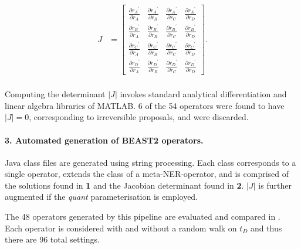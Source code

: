 \documentclass[10pt,letterpaper]{article}
\begin{document}
\begin{align}
	J &= \begin{bmatrix} \frac{\partial {r_A}^\prime}{\partial r_A} & \frac{\partial {r_A}^\prime}{\partial r_B} & \frac{\partial {r_A}^\prime}{\partial r_C} & \frac{\partial {r_A}^\prime}{\partial r_D} \\
	\frac{\partial {r_B}^\prime}{\partial r_A} & \frac{\partial {r_B}^\prime}{\partial r_B} & \frac{\partial {r_B}^\prime}{\partial r_C} & \frac{\partial {r_B}^\prime}{\partial r_D} \\
	\frac{\partial {r_C}^\prime}{\partial r_A} & \frac{\partial {r_C}^\prime}{\partial r_B} & \frac{\partial {r_C}^\prime}{\partial r_C} & \frac{\partial {r_C}^\prime}{\partial r_D} \\
	\frac{\partial {r_D}^\prime}{\partial r_A} & \frac{\partial {r_D}^\prime}{\partial r_B} & \frac{\partial {r_D}^\prime}{\partial r_C} & \frac{\partial {r_D}^\prime}{\partial r_D} \end{bmatrix}.  \nonumber  \\
\end{align}


Computing the determinant $|J|$ invokes standard analytical differentiation and linear algebra libraries of MATLAB. 6 of the 54 operators were found to have $|J|=0$, corresponding to irreversible proposals, and were discarded. 


\paragraph{3. Automated generation of BEAST2 operators.} Java class files are generated using string processing. Each class corresponds to a single operator, extends the class of a meta-NER-operator, and is comprised of the solutions found in \textbf{1} and the Jacobian determinant found in \textbf{2}. $|J|$ is further augmented if the \textit{quant} parameterisation is employed.

The 48 operators generated by this pipeline are evaluated and compared in \textbf{}. Each operator is considered with and without a random walk on $t_D$ and thus there are 96 total settings.




\end{document}
